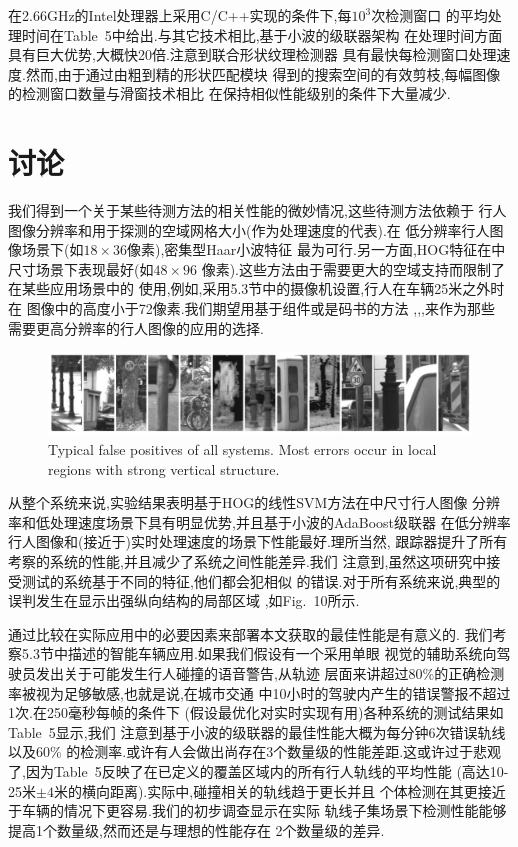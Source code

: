 \documentclass[10pt,letterpaper,journal,compsoc]{IEEEtran}
\begin{document}
在2.66GHz的Intel处理器上采用C/C++实现的条件下,每$10^3$次检测窗口
的平均处理时间在Table~5中给出.与其它技术相比,基于小波的级联器架构
在处理时间方面具有巨大优势,大概快20倍.注意到联合形状纹理检测器
具有最快每检测窗口处理速度.然而,由于通过由粗到精的形状匹配模块
得到的搜索空间的有效剪枝,每幅图像的检测窗口数量与滑窗技术相比
在保持相似性能级别的条件下大量减少.
\section{讨论}
我们得到一个关于某些待测方法的相关性能的微妙情况,这些待测方法依赖于
行人图像分辨率和用于探测的空域网格大小(作为处理速度的代表).在
低分辨率行人图像场景下(如$18\times36$像素),密集型Haar小波特征
最为可行.另一方面,HOG特征在中尺寸场景下表现最好($如48\times96$
像素).这些方法由于需要更大的空域支持而限制了在某些应用场景中的
使用,例如,采用5.3节中的摄像机设置,行人在车辆25米之外时在
图像中的高度小于72像素.我们期望用基于组件或是码书的方法
\cite{bib1},\cite{bib39},\cite{bib40},\cite{bib61}来作为那些
需要更高分辨率的行人图像的应用的选择.

\begin{figure}[!t]
\centering
\includegraphics[width=7in]{fig10.JPG}
\caption{Typical false positives of all systems. Most errors occur in local regions with strong vertical structure.
}
\end{figure}
从整个系统来说,实验结果表明基于HOG的线性SVM方法在中尺寸行人图像
分辨率和低处理速度场景下具有明显优势,并且基于小波的AdaBoost级联器
在低分辨率行人图像和(接近于)实时处理速度的场景下性能最好.理所当然,
跟踪器提升了所有考察的系统的性能,并且减少了系统之间性能差异.我们
注意到,虽然这项研究中接受测试的系统基于不同的特征,他们都会犯相似
的错误.对于所有系统来说,典型的误判发生在显示出强纵向结构的局部区域
,如Fig.~10所示.

通过比较在实际应用中的必要因素来部署本文获取的最佳性能是有意义的.
我们考察5.3节中描述的智能车辆应用.如果我们假设有一个采用单眼
视觉的辅助系统向驾驶员发出关于可能发生行人碰撞的语音警告,从轨迹
层面来讲超过80\%的正确检测率被视为足够敏感,也就是说,在城市交通
中10小时的驾驶内产生的错误警报不超过1次.在250毫秒每帧的条件下
(假设最优化对实时实现有用)各种系统的测试结果如Table~5显示,我们
注意到基于小波的级联器的最佳性能大概为每分钟6次错误轨线以及60\%
的检测率.或许有人会做出尚存在3个数量级的性能差距.这或许过于悲观
了,因为Table~5反映了在已定义的覆盖区域内的所有行人轨线的平均性能
(高达10-25米$\pm4$米的横向距离).实际中,碰撞相关的轨线趋于更长并且
个体检测在其更接近于车辆的情况下更容易.我们的初步调查显示在实际
轨线子集场景下检测性能能够提高1个数量级,然而还是与理想的性能存在
2个数量级的差异.
\end{document}
